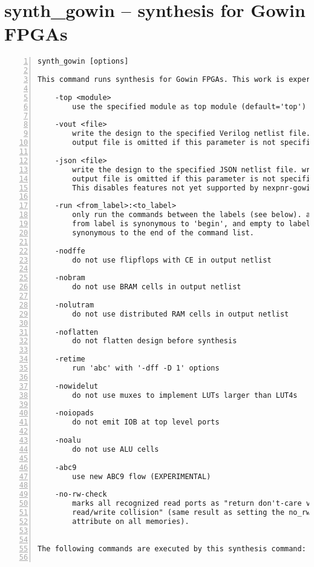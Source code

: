 \section{synth\_gowin -- synthesis for Gowin FPGAs}
\label{cmd:synth_gowin}
\begin{lstlisting}[numbers=left,frame=single]
    synth_gowin [options]

This command runs synthesis for Gowin FPGAs. This work is experimental.

    -top <module>
        use the specified module as top module (default='top')

    -vout <file>
        write the design to the specified Verilog netlist file. writing of an
        output file is omitted if this parameter is not specified.

    -json <file>
        write the design to the specified JSON netlist file. writing of an
        output file is omitted if this parameter is not specified.
        This disables features not yet supported by nexpnr-gowin.

    -run <from_label>:<to_label>
        only run the commands between the labels (see below). an empty
        from label is synonymous to 'begin', and empty to label is
        synonymous to the end of the command list.

    -nodffe
        do not use flipflops with CE in output netlist

    -nobram
        do not use BRAM cells in output netlist

    -nolutram
        do not use distributed RAM cells in output netlist

    -noflatten
        do not flatten design before synthesis

    -retime
        run 'abc' with '-dff -D 1' options

    -nowidelut
        do not use muxes to implement LUTs larger than LUT4s

    -noiopads
        do not emit IOB at top level ports

    -noalu
        do not use ALU cells

    -abc9
        use new ABC9 flow (EXPERIMENTAL)

    -no-rw-check
        marks all recognized read ports as "return don't-care value on
        read/write collision" (same result as setting the no_rw_check
        attribute on all memories).


The following commands are executed by this synthesis command:


\end{lstlisting}
